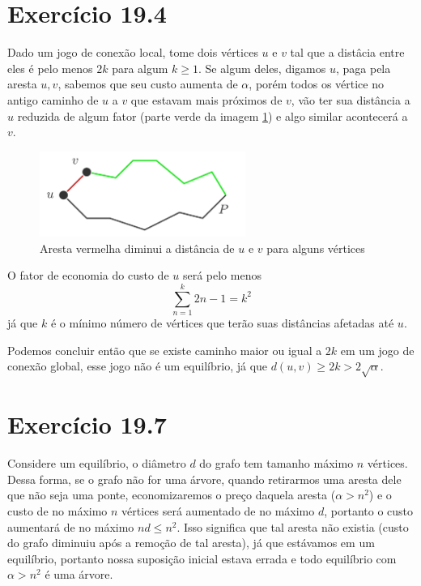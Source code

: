 \documentclass[12pt, letterpaper]{article}
\begin{document}
\section{Exercício 19.4}
	Dado um jogo de conexão local, tome dois vértices $u$ e $v$ tal que a distâcia entre eles é pelo menos $2k$ para algum $k \geq 1$.
	Se algum deles, digamos $u$, paga pela aresta ${u, v}$, sabemos que seu custo aumenta de $\alpha$, porém todos os vértice no antigo caminho de $u$ a $v$ que estavam mais próximos de $v$, vão ter sua distância a $u$ reduzida de algum fator (parte verde da imagem \ref{img:path}) e algo similar acontecerá a $v$.
	\begin{figure}[h]
		\label{img:path}
        \centering
        \includegraphics[width=0.6\textwidth]{path.png}
        \\{Aresta vermelha diminui a distância de $u$ e $v$ para alguns vértices}
    \end{figure}

    O fator de economia do custo de $u$ será pelo menos
    $$
    \sum_{n = 1}^{k}{2n - 1} = k^2
    $$ 
    já que $k$ é o mínimo número de vértices que terão suas distâncias afetadas até $u$.

    Podemos concluir então que se existe caminho maior ou igual a $2k$ em um jogo de conexão global, esse jogo não é um equilíbrio, já que $d(u, v) \geq 2k > 2\sqrt{\alpha}$.

\section{Exercício 19.7}
	Considere um equilíbrio, o diâmetro $d$ do grafo tem tamanho máximo $n$ vértices. Dessa forma, se o grafo não for uma árvore, quando retirarmos uma aresta dele que não seja uma ponte, economizaremos o preço daquela aresta ($\alpha > n^2$) e o custo de no máximo $n$ vértices será aumentado de no máximo $d$, portanto o custo aumentará de no máximo $nd \leq n^2$. Isso significa que tal aresta não existia (custo do grafo diminuiu após a remoção de tal aresta), já que estávamos em um equilíbrio, portanto nossa suposição inicial estava errada e todo equilíbrio com $\alpha > n^2$ é uma árvore.
\end{document}
